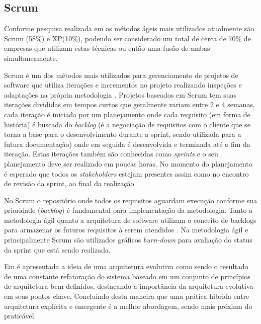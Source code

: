 \subsection{Scrum}
Conforme pesquisa realizada em \cite{versionone2016} os métodos ágeis mais utilizados atualmente são Scrum (58\%) e XP(10\%), podendo ser considerado um total de cerca de 70\% de empresas que utilizam estas técnicas ou então uma fusão de ambas simultaneamente.

Scrum é um dos métodos mais utilizados para gerenciamento de projetos de software que utiliza iterações e incrementos no projeto realizando inspeções e adaptações na própria metodologia \cite{babar2013agile}. Projetos baseados em Scrum tem suas iterações divididas em tempos curtos que geralmente variam entre 2 e 4 semanas, cada iteração é iniciada por um planejamento onde cada requisito (em forma de história) é buscada do \textit{backlog} (é a negociação de requisitos com o cliente que se torna a base para o desenvolvimento durante a sprint, sendo utilizada para a futura documentação) onde em seguida é desenvolvida e terminada até o fim da iteração. Estas iterações também são conhecidas como \textit{sprints} e o seu planejamento deve ser realizado em poucas horas. No momento do planejamento é esperado que todos os \textit{stakeholders} estejam presentes assim como no encontro de revisão da sprint, ao final da realização.

No Scrum o repositório onde todos os requisitos aguardam execução conforme sua prioridade (\textit{backlog}) é fundamental para implementação da metodologia. Tanto a metodologia ágil quanto a arquitetura de software utilizam o conceito de backlogs para armazenar os futuros requisitos à serem atendidos \cite{hofmeister2007general}. Na metodologia ágil e principalmente Scrum são utilizados gráficos \textit{burn-down} para avaliação do status da sprint que está sendo realizada.

Em \cite{babar2013agile} é apresentada a ideia de uma arquitetura evolutiva como sendo o resultado de uma constante refatoração do sistema baseado em um conjunto de princípios de arquitetura bem definidos, destacando a importância da arquitetura evolutiva em seus pontos chave. Concluindo desta maneira que uma prática hibrida entre arquitetura explícita e emergente é a melhor abordagem, sendo mais próxima do praticável.


